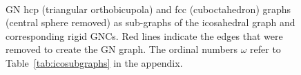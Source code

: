 \begin{figure}[htb]
    \centering
    \\
    \caption{GN hcp (triangular orthobicupola) and fcc (cuboctahedron) graphs
    (central sphere removed) as sub-graphs of the icosahedral graph and
    corresponding rigid \acs{GNC}s.  Red lines indicate the edges that were removed to
    create the GN graph. The ordinal numbers $\omega$ refer to
    Table~\ref{tab:icosubgraphs} in the appendix.}
    \label{fig:GNshellgraphs}
\end{figure}

